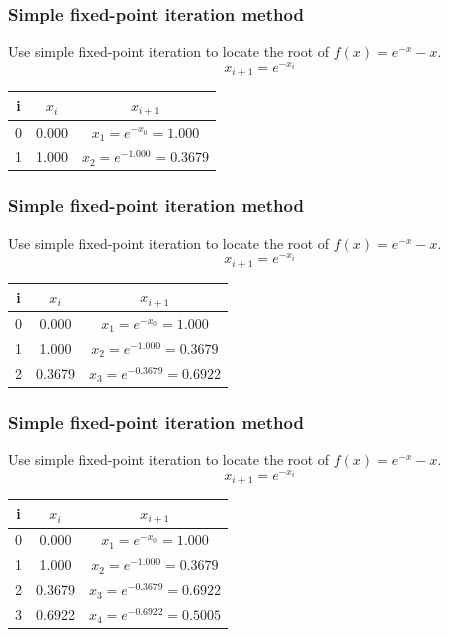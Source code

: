 \documentclass{if-beamer}
\begin{document}
\begin{frame}[t]
\frametitle{Simple fixed-point iteration method}
Use simple fixed-point iteration to locate the root of $f(x) = e^{-x}-x$.
$$x_{i+1} = e^{-x_i}$$
\begin{table}
	\begin{tabular}{c | c | c}
		i & $x_i$ & $x_{i+1}$ \\
		\hline
		0 & 0.000 & $x_1 = e^{-x_0} = 1.000$\\ 
		1 & 1.000 & $x_2 = e^{-1.000}=0.3679$ \\ 
	\end{tabular}
\end{table}
\end{frame}

\begin{frame}[t]
\frametitle{Simple fixed-point iteration method}
Use simple fixed-point iteration to locate the root of $f(x) = e^{-x}-x$.
$$x_{i+1} = e^{-x_i}$$
\begin{table}
	\begin{tabular}{c | c | c}
		i & $x_i$ & $x_{i+1}$ \\
		\hline
		0 & 0.000 & $x_1 = e^{-x_0} = 1.000$\\ 
		1 & 1.000 & $x_2 = e^{-1.000}= 0.3679$ \\
		2 & 0.3679 & $x_3 = e^{-0.3679} =  0.6922$ \\ 
	\end{tabular}
\end{table}
\end{frame}

\begin{frame}[t]
\frametitle{Simple fixed-point iteration method}
Use simple fixed-point iteration to locate the root of $f(x) = e^{-x}-x$.
$$x_{i+1} = e^{-x_i}$$
\begin{table}
	\begin{tabular}{c | c | c}
		i & $x_i$ & $x_{i+1}$ \\
		\hline
		0 & 0.000 & $x_1 = e^{-x_0} = 1.000$\\ 
		1 & 1.000 & $x_2 = e^{-1.000}= 0.3679$ \\
		2 & 0.3679 & $x_3 = e^{-0.3679} =  0.6922$ \\ 
		3 & 0.6922 & $x_4 = e^{-0.6922} = 0.5005$ \\	
	\end{tabular}
\end{table}
\end{frame}
\end{document}
